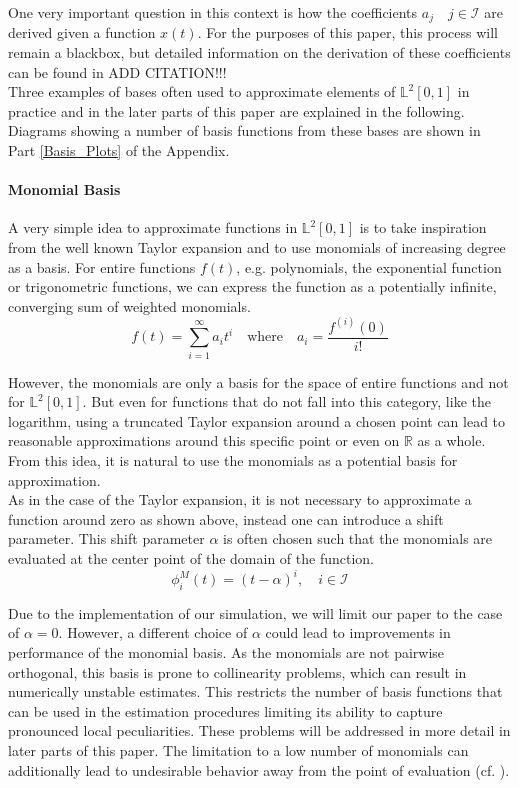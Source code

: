\documentclass[11pt,twoside,a4paper]{article}
\begin{document}
	One very important question in this context is how the coefficients $a_j \quad j \in \mathcal{I}$ are derived given a function $x(t)$. For the purposes of this paper, this process will remain a blackbox, but detailed information on the derivation of these coefficients can be found in {\color{red} ADD CITATION!!!} \\
	Three examples of bases often used to approximate elements of $\mathbb{L}^2[0,1]$ in practice and in the later parts of this paper are explained in the following. Diagrams showing a number of basis functions from these bases are shown in Part \ref{Basis_Plots} of the Appendix.
	
	\paragraph{Monomial Basis}
	A very simple idea to approximate functions in $\mathbb{L}^2[0,1]$ is to take inspiration from the well known Taylor expansion and to use monomials of increasing degree as a basis. For entire functions $f(t)$, e.g. polynomials, the exponential function or trigonometric functions, we can express the function as a potentially infinite, converging sum of weighted monomials.
	\begin{equation}\label{Taylor_expansion}
		f(t) = \sum_{i = 1}^{\infty}a_i t^i \quad \text{where} \quad a_i = \frac{f^{(i)}(0)}{i!}
	\end{equation}
	
	However, the monomials are only a basis for the space of entire functions and not for $\mathbb{L}^2[0,1]$. But even for functions that do not fall into this category, like the logarithm, using a truncated Taylor expansion around a chosen point can lead to reasonable approximations around this specific point or even on $\mathbb{R}$ as a whole. From this idea, it is natural to use the monomials as a potential basis for approximation. \\
	As in the case of the Taylor expansion, it is not necessary to approximate a function around zero as shown above, instead one can introduce a shift parameter. This shift parameter $\alpha$ is often chosen such that the monomials are evaluated at the center point of the domain of the function.
	\begin{equation}
		\phi_{i}^{M}(t) = (t-\alpha)^i, \quad i \in \mathcal{I}
	\end{equation}

	Due to the implementation of our simulation, we will limit our paper to the case of $\alpha = 0$. However, a different choice of $\alpha$ could lead to improvements in performance of the monomial basis.
	As the monomials are not pairwise orthogonal, this basis is prone to collinearity problems, which can result in numerically unstable estimates. This restricts the number of basis functions that can be used in the estimation procedures limiting its ability to capture pronounced local peculiarities. These problems will be addressed in more detail in later parts of this paper. The limitation to a low number of monomials can additionally lead to undesirable behavior away from the point of evaluation (cf. \cite{ramsay_functional_2005}).
	\vspace{-0.2cm}
	
\end{document}
